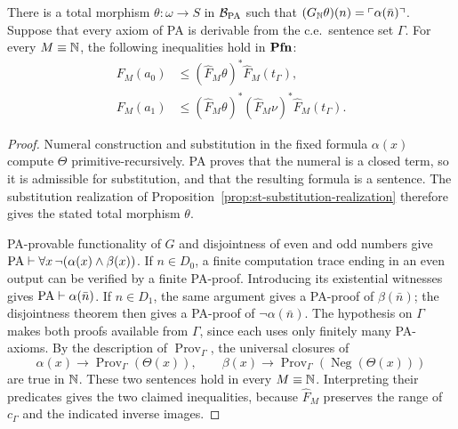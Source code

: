 \begin{lemma}
\label{lem:arithmetic-diagonal-representation}
There is a total morphism
$\theta:\omega\to S$ in $\mathcal B_{\mathrm{PA}}$ such that
$(G_{\mathbb N}\theta)(n)=\ulcorner\alpha(\bar n)\urcorner$.
Suppose that every axiom of PA is derivable from the c.e.\
sentence set $\Gamma$. For every $M\equiv\mathbb N$, the following
inequalities hold in $\mathbf{Pfn}$:
\begin{align*}
 F_M(a_0)&\le
   (\widehat F_M\theta)^*\widehat F_M(t_\Gamma),\\
 F_M(a_1)&\le
   (\widehat F_M\theta)^*(\widehat F_M\nu)^*
                   \widehat F_M(t_\Gamma).
\end{align*}
\end{lemma}
\begin{proof}
Numeral construction and substitution in the fixed formula
$\alpha(x)$ compute $\Theta$ primitive-recursively.
PA proves that the numeral is a closed term, so it is admissible
for substitution, and that the resulting formula is a sentence.
The substitution realization of
Proposition~\ref{prop:st-substitution-realization} therefore gives
the stated total morphism $\theta$.

PA-provable functionality of $G$ and disjointness of even and odd
numbers give $\mathrm{PA}\vdash\forall x\,\neg(\alpha(x)\land\beta(x))$.
If $n\in D_0$, a finite computation trace ending in an even
output can be verified by a finite PA-proof. Introducing its
existential witnesses gives $\mathrm{PA}\vdash\alpha(\bar n)$.
If $n\in D_1$, the same argument gives a PA-proof of
$\beta(\bar n)$; the disjointness theorem then gives
a PA-proof of $\neg\alpha(\bar n)$.
The hypothesis on $\Gamma$ makes both proofs available from
$\Gamma$, since each uses only finitely many PA-axioms.
By the description of $\operatorname{Prov}_\Gamma$, the
universal closures of
\[
 \alpha(x)\longrightarrow\operatorname{Prov}_\Gamma(\Theta(x)),
 \qquad
 \beta(x)\longrightarrow
       \operatorname{Prov}_\Gamma(\operatorname{Neg}(\Theta(x)))
\]
are true in $\mathbb N$.
These two sentences hold in every $M\equiv\mathbb N$.
Interpreting their predicates gives the two claimed
inequalities, because $\widehat F_M$ preserves the range of
$c_\Gamma$ and the indicated inverse images.
\end{proof}

